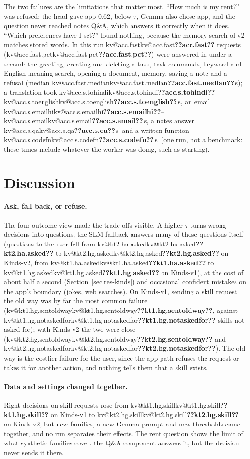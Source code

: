 \documentclass[11pt,a4paper]{article}
\makeatletter
\DeclareRobustCommand{\kv}[1]{\ifcsname kv@#1\endcsname\csname kv@#1\endcsname\else\textbf{??#1??}\fi}
\newcommand{\s}{\,s}
\makeatother
\begin{document}
The two failures are the limitations that matter most. ``How much is my rent?'' was refused: the head gave app
0.62, below $\tau$, Gemma also chose app, and the question never reached notes Q\&A, which answers it correctly when it
does. ``Which preferences have I set?'' found nothing, because the memory search of v2 matches stored words. In this run
\kv{acc.fast} requests (\kv{acc.fast.pct}) were answered in under a second: the greeting, creating and deleting a task, task
commands, keyword and English meaning search, opening a document, memory, saving a note and a refusal (median
\kv{acc.fast.median}\s); a translation took \kv{acc.s.tohindi}--\kv{acc.s.toenglish}\s, an email
\kv{acc.s.emailhi}--\kv{acc.s.email}\s, a notes answer \kv{acc.s.qa}\s\ and a written function \kv{acc.s.codefn}\s\ (one run, not a
benchmark: these times include whatever the worker was doing, such as starting).

\section{Discussion}\label{sec:discussion}

\paragraph{Ask, fall back, or refuse.} The four-outcome view made the trade-offs visible. A higher $\tau$ turns wrong
decisions into questions; the SLM fallback answers many of those questions itself (questions to the user fell from
\kv{kt2.ha.asked} to \kv{kt2.hg.asked} on Kinds-v2, from \kv{kt1.ha.asked} to \kv{kt1.hg.asked} on Kinds-v1), at the
cost of about half a second (Section~\ref{sec:res-kinds}) and occasional confident mistakes on the app's boundary
(jokes, web searches). On Kinds-v1, sending a skill request the old way was by far the most common failure
(\kv{kt1.hg.sentoldway}, against \kv{kt1.hg.notaskedfor} skills not asked for); with Kinds-v2 the two were close
(\kv{kt2.hg.sentoldway} and \kv{kt2.hg.notaskedfor}). The old way is the costlier failure for the user, since the
app path refuses the request or takes it for another action, and nothing tells them that a skill exists.

\paragraph{Data and settings changed together.} Right decisions on skill requests rose from \kv{kt1.hg.skill} on
Kinds-v1 to \kv{kt2.hg.skill} on Kinds-v2, but new families, a new Gemma prompt and new thresholds came together, and no
run separates their effects. The rent question shows the limit of what synthetic families
cover: the Q\&A component answers it, but the decision never sends it there.
\end{document}
